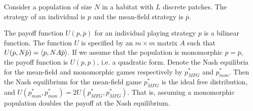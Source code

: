 \begin{proposition}
  \label{prop:doubleup}
  Consider a population of size $N$ in a habitat with $L$ discrete patches. The strategy of an individual is $p$ and the mean-field strategy is $\overbar{p}$.

  The payoff function $U(p,\overbar{p})$ for an individual playing strategy $p$ is a bilinear function. The function $U$ is specified by an $m\times m$ matrix $A$ such that $U(p,N\overbar{p}) = \ip{p}{N A \overbar{p}}$. If we assume that the population is monomorphic $p = \overbar{p}$, the payoff function is $U(p,p)$, i.e. a quadratic form. Denote the Nash equilibria for the mean-field and monomorphic games respectively by $p^*_{MFG}$ and $p^*_{mon}$. Then the Nash equilibrium for the mean-field game $p^*_{MFG}$ is the ideal free distribution, and $U(p^*_{mon}, p^*_{mon}) = 2U(p^*_{MFG},p^*_{MFG})$. That is, assuming a monomorphic population doubles the payoff at the Nash equilibrium.
\end{proposition}
